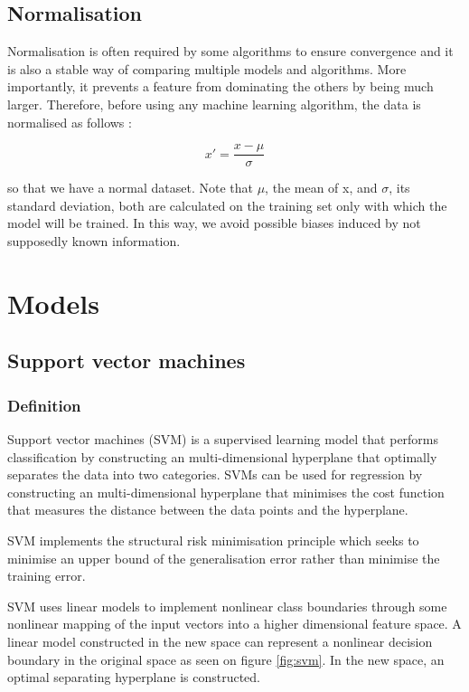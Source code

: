 \documentclass[11pt,a4paper,oneside]{book}
\begin{document}
\subsection{Normalisation}

Normalisation is often required by some algorithms to ensure convergence and it is also a stable way of comparing multiple models and algorithms. More importantly, it prevents a feature from dominating the others by being much larger. Therefore, before using any machine learning algorithm, the data is normalised as follows : 

\begin{equation}
{x}' = \frac{x - \mu }{\sigma }
\end{equation}

so that we have a normal dataset. Note that $\mu$, the mean of x, and $\sigma$, its standard deviation, both are calculated on the training set only with which the model will be trained. In this way, we avoid possible biases induced by not supposedly known information.




\section{Models}\label{MLalgs}

\subsection{Support vector machines}

\subsubsection{Definition}

Support vector machines (SVM) is a supervised learning model that performs classification by constructing an multi-dimensional hyperplane that optimally separates the data into two categories. SVMs can be used for regression by constructing an multi-dimensional hyperplane that minimises the cost function that measures the distance between the data points and the hyperplane.

SVM implements the structural risk minimisation principle which seeks to minimise an upper bound of the generalisation error rather than minimise the training error.

SVM uses linear models to implement nonlinear class boundaries through some nonlinear mapping of the input vectors into a higher dimensional feature space. A linear model constructed in the new space can represent a nonlinear decision boundary in the original space as seen on figure \ref{fig:svm}. In the new space, an optimal separating hyperplane is constructed. \cite{kim}\cite{liwang}\cite{Smola}
\end{document}

